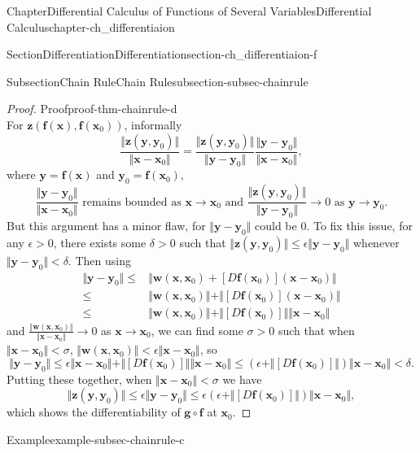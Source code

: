 \documentclass[oneside,10pt,]{book}
\numberwithin{equation}{section}
\newcommand{\bff}{\mathbf{f}}
\newcommand{\bg}{\mathbf{g}}
\newcommand{\bw}{\mathbf{w}}
\newcommand{\bx}{\mathbf{x}}
\newcommand{\by}{\mathbf{y}}
\newcommand{\bz}{\mathbf{z}}
\newcommand{\lt}{<}
\newcommand{\gt}{>}
\newcommand{\amp}{&}
\begin{document}
\begin{chapterptx}{Chapter}{Differential Calculus of Functions of Several Variables}{}{Differential Calculus}{}{}{chapter-ch_differentiaion}
\begin{sectionptx}{Section}{Differentiation}{}{Differentiation}{}{}{section-ch_differentiaion-f}
\begin{subsectionptx}{Subsection}{Chain Rule}{}{Chain Rule}{}{}{subsection-subsec-chainrule}
\begin{proof}{Proof}{}{proof-thm-chainrule-d}
\begin{equation*}
\end{equation*}
For  \(\bz(\mathbf f(\bx), \mathbf f(\bx_0))\), informally%
\begin{equation*}
\frac{\Vert \bz (\by, \by_0) \Vert}{\Vert \bx -\bx_0 \Vert}
=\frac{\Vert \bz (\by, \by_0) \Vert}{\Vert \by -\by_0\Vert} \frac{\Vert \by -\by_0\Vert}{\Vert \bx -\bx_0 \Vert},
\end{equation*}
where \(\by =\mathbf f (\bx)\) and \(\by_0=\mathbf f (\bx_0)\),%
\begin{equation*}
\frac{\Vert \by -\by_0\Vert}{\Vert \bx -\bx_0 \Vert} \text{ remains bounded
as $\bx \to \bx_0$ and 
$\frac{\Vert \bz (\by, \by_0) \Vert}{\Vert \by -\by_0\Vert} \to 0$   as  $\by \to \by_0$.}
\end{equation*}
But this argument has a minor flaw, for  \(\Vert \by -\by_0\Vert\) could be \(0\). To fix this issue, for any \(\epsilon \gt 0\), there exists some \(\delta \gt 0\) such that \(\Vert \bz (\by, \by_0) \Vert \le \epsilon \Vert \by -\by_0\Vert\) whenever \(\Vert \by -\by_0\Vert \lt \delta\).  Then using%
\begin{align*}
\Vert \by -\by_0 \Vert \le \amp  \Vert \bw (\bx, \bx_0)  + [D\mathbf f(\bx_0)](\bx -\bx_0)\Vert\\
\le \amp \Vert \bw (\bx, \bx_0) \Vert  + \Vert [D\mathbf f(\bx_0)](\bx -\bx_0)\Vert \\
\le \amp \Vert \bw (\bx, \bx_0) \Vert  + \Vert [D\mathbf f(\bx_0)]\Vert \Vert \bx -\bx_0\Vert 
\end{align*}
and \(\frac{\Vert \bw (\bx, \bx_0) \Vert}{\Vert \bx -\bx_0 \Vert}\to 0\) as \(\bx\to \bx_0\), we can find some \(\sigma \gt 0\) such that when \(\Vert \bx -\bx_0\Vert \lt \sigma\), \(\Vert \bw (\bx, \bx_0) \Vert \lt \epsilon \Vert \bx -\bx_0\Vert\), so%
\begin{equation*}
\Vert \by-\by_0 \Vert\le \epsilon \Vert \bx -\bx_0\Vert + \Vert [D\mathbf f(\bx_0)]\Vert \Vert \bx -\bx_0\Vert
\le \left( \epsilon + \Vert [D\mathbf f(\bx_0)]\Vert\right) \Vert \bx -\bx_0\Vert \lt \delta.
\end{equation*}
Putting these together, when \(\Vert \bx -\bx_0\Vert \lt \sigma\)  we have%
\begin{equation*}
\Vert \bz (\by, \by_0) \Vert \le \epsilon \Vert \by-\by_0 \Vert\le  \epsilon 
\left( \epsilon + \Vert [D\mathbf f(\bx_0)]\Vert\right) \Vert \bx -\bx_0\Vert,
\end{equation*}
which shows the differentiability of \(\bg \circ \bff \) at \(\bx_0\). %
\end{proof}
\begin{example}{Example}{}{example-subsec-chainrule-c}%

\end{example}
\end{subsectionptx}
\end{sectionptx}
\end{chapterptx}
\end{document}
